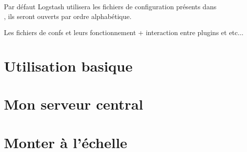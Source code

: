 Par défaut Logstash utilisera les fichiers de configuration présents dans \\ , ils seront ouverts par ordre alphabétique.




Les fichiers de confs et leurs fonctionnement + interaction entre plugins et etc...





\section{Utilisation basique}

\section{Mon serveur central}



\section{Monter à l'échelle}




